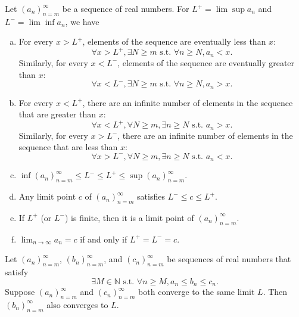 \begin{lem}
  Let $(a_n)_{n=m}^{\infty}$ be a sequence of real numbers.
  For $L^+=\lim\sup a_n$ and $L^-=\lim\inf a_n$,
  we have
  \begin{enumerate}[(a)]
  \item For every $x>L^+$,
    elements of the sequence are eventually less than $x$:
    \begin{displaymath}
      \forall x>L^+, \exists N\ge m \text{ s.t. }
      \forall n\ge N, a_n<x.
    \end{displaymath}
    Similarly, for every $x<L^-$,
    elements of the sequence are eventually greater than $x$:
    \begin{displaymath}
      \forall x<L^-, \exists N\ge m \text{ s.t. }
      \forall n\ge N, a_n>x.
    \end{displaymath}
  \item For every $x<L^+$,
    there are an infinite number of elements in the sequence
    that are greater than $x$:
    \begin{displaymath}
      \forall x<L^+, \forall N\ge m,
      \exists n\ge N \text{ s.t. } a_n>x.
    \end{displaymath}
    Similarly,
    for every $x>L^-$,
    there are an infinite number of elements in the sequence
    that are less than $x$:
    \begin{displaymath}
      \forall x>L^-, \forall N\ge m,
      \exists n\ge N \text{ s.t. } a_n < x.
    \end{displaymath}
  \item $\inf(a_n)_{n=m}^{\infty}\le L^- \le L^+ \le
    \sup(a_n)_{n=m}^{\infty}$.
  \item Any limit point $c$ of $(a_n)_{n=m}^{\infty}$
    satisfies $L^-\le c \le L^+$.
  \item If $L^+$ (or $L^-$) is finite,
    then it is a limit point
    of $(a_n)_{n=m}^{\infty}$.
  \item $\lim_{n\rightarrow \infty} a_n = c$
    if and only if $L^+=L^-=c$.
    
  \end{enumerate}
\end{lem}

\begin{thm}
  \label{thm:squeezeTest}
  Let $(a_n)_{n=m}^{\infty}$, $(b_n)_{n=m}^{\infty}$,
  and $(c_n)_{n=m}^{\infty}$ be sequences of real numbers
  that satisfy
  \begin{displaymath}
    \exists M\in \mathbb{N} \text{ s.t. }
    \forall n\ge M, a_n\le b_n \le c_n.
  \end{displaymath}
  Suppose $(a_n)_{n=m}^{\infty}$ and $(c_n)_{n=m}^{\infty}$
  both converge to the same limit $L$.
  Then $(b_n)_{n=m}^{\infty}$ also converges to $L$.
\end{thm}

